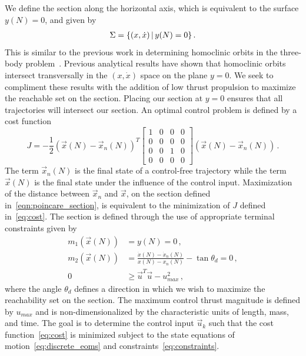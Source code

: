 \documentclass[preprint]{elsarticle}
\begin{document}
We define the \Poincare section along the horizontal axis, which is equivalent to the surface \( y(N) = 0 \), and given by
\begin{align}
	\Sigma = \left\{  ( x, \dot{x}) \, | \, y(N) = 0 \right\} . 
	\label{eqn:poincare_section}
\end{align}
This is similar to the previous work in determining homoclinic orbits in the three-body problem~\cite{llibre1985,koon2011}.
Previous analytical results have shown that homoclinic orbits intersect transversally in the \( (x, \dot{x} ) \) space on the plane \( y = 0 \).
We seek to compliment these results with the addition of low thrust propulsion to maximize the reachable set on the \Poincare section.
Placing our section at \( y = 0\) ensures that all trajectories will intersect our section.
An optimal control problem is defined by a  cost function
\begin{equation}
	J = -\frac{1}{2} \left( \vec{x}(N) - \vec{x}_{n}(N)\right)^T 
	\left[
	\begin{array}{cccc}
		1 & 0& 0& 0 \\
		 0& 0& 0& 0\\
		 0 & 0 & 1 &0\\
		 0 & 0& 0& 0
	\end{array}
	\right]
	\left( \vec{x}(N) - \vec{x}_{n}(N)\right) \, .
	\label{eq:cost}
\end{equation}
The term \( \vec{x}_n(N) \) is the final state of a control-free trajectory while the term \( \vec{x}(N)\) is the final state under the influence of the control input.
Maximization of the distance between \( \vec{x}_n \) and \(\vec{x} \), on the \Poincare section defined in~\cref{eqn:poincare_section}, is equivalent to the minimization of \( J \) defined in~\cref{eq:cost}.
The \Poincare section is defined through the use of appropriate terminal constraints given by
\begin{subequations}
\begin{align}
    m_1( \vec{x}(N) ) &= y(N) = 0 \, , \\ 
    m_2 ( \vec{x}(N) )&=  \frac{\dot{x}(N) - \dot{x}_n(N) }{x(N) -x_n(N) } - \tan{\theta_d} = 0\, , \\
	 0 &\geq\vec{u}^T \vec{u} - u_{max}^2 \, ,
\end{align}
    \label{eq:constraints}
\end{subequations}
where the angle \( \theta_d\) defines a direction in which we wish to maximize the reachability set on the \Poincare section.
The maximum control thrust magnitude is defined by \( u_{max} \) and is non-dimensionalized by the characteristic units of length, mass, and time.
The goal is to determine the control input \( \vec{u}_k\) such that the cost function~\cref{eq:cost} is minimized subject to the state equations of motion~\cref{eq:discrete_eoms} and constraints~\cref{eq:constraints}.
\end{document}
